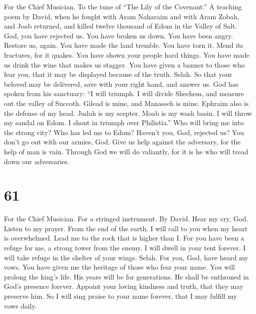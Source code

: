 For the Chief Musician. To the tune of ``The Lily of the Covenant.'' A
teaching poem by David, when he fought with Aram Naharaim and with Aram
Zobah, and Joab returned, and killed twelve thousand of Edom in the
Valley of Salt.  God, you have rejected us. You have
broken us down. You have been angry. Restore us, again. 
You have made the land tremble. You have torn it. Mend its fractures,
for it quakes.  You have shown your people hard things.
You have made us drink the wine that makes us stagger. 
You have given a banner to those who fear you, that it may be displayed
because of the truth. Selah.  So that your beloved may be
delivered, save with your right hand, and answer us.  God
has spoken from his sanctuary: ``I will triumph. I will divide Shechem,
and measure out the valley of Succoth.  Gilead is mine,
and Manasseh is mine. Ephraim also is the defense of my head. Judah is
my scepter.  Moab is my wash basin. I will throw my sandal
on Edom. I shout in triumph over Philistia.''  Who will
bring me into the strong city? Who has led me to Edom? 
Haven't you, God, rejected us? You don't go out with our armies, God.
 Give us help against the adversary, for the help of man
is vain.  Through God we will do valiantly, for it is he
who will tread down our adversaries.

\hypertarget{section-60}{%
\section{61}\label{section-60}}

For the Chief Musician. For a stringed instrument. By David.
 Hear my cry, God. Listen to my prayer. 
From the end of the earth, I will call to you when my heart is
overwhelmed. Lead me to the rock that is higher than I. 
For you have been a refuge for me, a strong tower from the enemy.
 I will dwell in your tent forever. I will take refuge in
the shelter of your wings. Selah.  For you, God, have
heard my vows. You have given me the heritage of those who fear your
name.  You will prolong the king's life. His years will be
for generations.  He shall be enthroned in God's presence
forever. Appoint your loving kindness and truth, that they may preserve
him.  So I will sing praise to your name forever, that I
may fulfill my vows daily.

